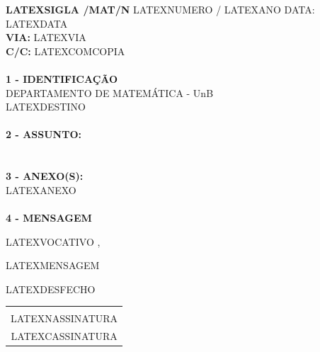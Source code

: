 \documentclass[12pt]{artigo_novo}
\begin{document}
\vspace*{.8cm}
\timbrado
\parindent=2cm 
\setlength{\baselineskip}{5mm}
\noindent 
\begin{minipage}{16cm}
\vspace*{-12mm}
\parindent=2cm
\setlength{\baselineskip}{5mm}
\vspace*{.2cm}
\noindent
\small
{\bf  LATEXSIGLA /MAT/N\primo} LATEXNUMERO / LATEXANO \hfill {DATA:} {LATEXDATA}
\vum \\
{\bf VIA:} {LATEXVIA}  
\\
{\bf C/C:} {LATEXCOMCOPIA}  
\\
\mbox{} \hrulefill
\\
{\bf 1 - IDENTIFICA\c{C}\~AO} 
\\
\phantom{xxx}{\bf Proced\^encia:} {DEPARTAMENTO DE MATEM\'ATICA - UnB}
\\
 {LATEXDESTINO }
\\
\mbox{} \hrulefill
\\
{\bf 2 - ASSUNTO:} 
\\
\phantom{xxx}{LATEXASSUNTO }
\\
\mbox{} \hrulefill
\\
{\bf 3 - ANEXO(S):} 
\\
\phantom{xxx} {LATEXANEXO }
\\
\mbox{} \hrulefill
\\
{ \bf 4 - MENSAGEM} 
\end{minipage}
\setlength{\baselineskip}{9mm}

\vspace*{1.5cm} 
LATEXVOCATIVO ,
\vspace*{10mm} 

LATEXMENSAGEM
\vspace*{1.0cm} 

LATEXDESFECHO 
\vspace*{1.0cm} 
\hspace*{5.5cm}
\setlength{\baselineskip}{4mm}
\begin{center}
\begin{tabular}{c}
\hline \vspace*{-3mm}\\
LATEXNASSINATURA \\
{\small LATEXCASSINATURA}
\end{tabular}
\end{center}
\end{document}
